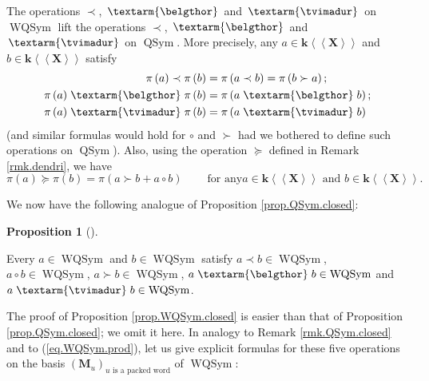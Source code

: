 \documentclass
[numbers=enddot,12pt,final,onecolumn,notitlepage,abstracton]{scrartcl}%
\theoremstyle{definition}
\newtheorem{prop}[theo]{Proposition}
\newenvironment{proposition}[1][]
{\begin{prop}[#1]\begin{leftbar}}
{\end{leftbar}\end{prop}}
\newcommand{\tvi}{\left. \textarm{\tvimadur} \right.}
\newcommand{\bel}{\left. \textarm{\belgthor} \right.}
\begin{document}
The operations $\left.  \prec\right.  $, $\bel $ and $\tvi $ on
$\operatorname*{WQSym}$ lift the operations $\left.  \prec\right.  $, $\bel $
and $\tvi $ on $\operatorname*{QSym}$. More precisely, any $a\in
\mathbf{k}\left\langle \left\langle \mathbf{X}\right\rangle \right\rangle $
and $b\in\mathbf{k}\left\langle \left\langle \mathbf{X}\right\rangle
\right\rangle $ satisfy%
\begin{align*}
\pi\left(  a\right)  \left.  \prec\right.  \pi\left(  b\right)   &
=\pi\left(  a\left.  \prec\right.  b\right)  =\pi\left(  b\left.
\succ\right.  a\right)  ;\\
\pi\left(  a\right)  \bel \pi\left(  b\right)   &  =\pi\left(  a
\bel b\right)  ;\\
\pi\left(  a\right)  \tvi \pi\left(  b\right)   &  =\pi\left(  a
\tvi b\right)
\end{align*}
(and similar formulas would hold for $\circ$ and $\left.  \succ\right.  $ had
we bothered to define such operations on $\operatorname*{QSym}$). Also, using
the operation $\left.  \succeq\right.  $ defined in Remark \ref{rmk.dendri},
we have%
\[
\pi\left(  a\right)  \left.  \succeq\right.  \pi\left(  b\right)  =\pi\left(
a\left.  \succ\right.  b+a\circ b\right)  \ \ \ \ \ \ \ \ \ \ \text{for any
}a\in\mathbf{k}\left\langle \left\langle \mathbf{X}\right\rangle \right\rangle
\text{ and }b\in\mathbf{k}\left\langle \left\langle \mathbf{X}\right\rangle
\right\rangle .
\]


We now have the following analogue of Proposition \ref{prop.QSym.closed}:

\begin{proposition}
\label{prop.WQSym.closed}Every $a\in\operatorname*{WQSym}$ and $b\in
\operatorname*{WQSym}$ satisfy $a\left.  \prec\right.  b\in
\operatorname*{WQSym}$, $a\circ b\in\operatorname*{WQSym}$, $a\left.
\succ\right.  b\in\operatorname*{WQSym}$, $a \bel b\in\operatorname*{WQSym}$
and $a \tvi b\in\operatorname*{WQSym}$.
\end{proposition}

The proof of Proposition \ref{prop.WQSym.closed} is easier than that of
Proposition \ref{prop.QSym.closed}; we omit it here. In analogy to Remark
\ref{rmk.QSym.closed} and to (\ref{eq.WQSym.prod}), let us give explicit
formulas for these five operations on the basis $\left(  \mathbf{M}%
_{u}\right)  _{u\text{ is a packed word}}$ of $\operatorname*{WQSym}$:
\end{document}
